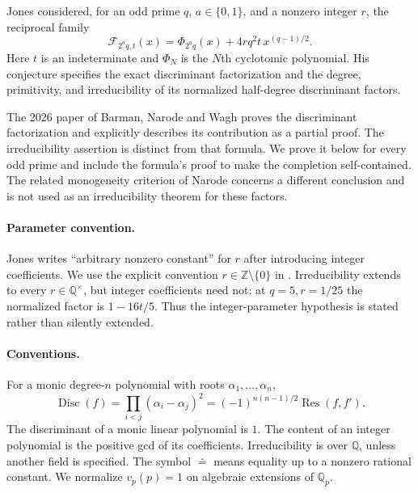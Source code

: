 \documentclass[11pt,a4paper]{article}
\theoremstyle{definition}
\theoremstyle{remark}
\newcommand{\QQ}{\mathbb Q}
\newcommand{\ZZ}{\mathbb Z}
\newcommand{\Disc}{\operatorname{Disc}}
\newcommand{\Res}{\operatorname{Res}}
\begin{document}
Jones \cite[Conjecture~3.3, p.~1476]{Jones} considered, for an odd prime
$q$, $a\in\{0,1\}$, and a nonzero integer $r$, the reciprocal family
\begin{equation}\label{eq:jones-family}
 \mathcal F_{2^a q,t}(x)=\Phi_{2^a q}(x)+4rq^2t\,x^{(q-1)/2}.
\end{equation}
Here $t$ is an indeterminate and $\Phi_N$ is the $N$th cyclotomic
polynomial. His conjecture specifies the exact discriminant
factorization and the degree, primitivity, and irreducibility of its
normalized half-degree discriminant factors.

The 2026 paper of Barman, Narode and Wagh
\cite[Theorem~1.3]{BNW} proves the discriminant factorization and
explicitly describes its contribution as a partial proof. The
irreducibility assertion is distinct from that formula. We prove it
below for every odd prime and include the formula's proof to make the
completion self-contained. The related monogeneity criterion of
Narode \cite{Narode} concerns a different conclusion and is not used
as an irreducibility theorem for these factors.

\paragraph{Parameter convention.}
Jones writes ``arbitrary nonzero constant'' for $r$ after introducing
integer coefficients. We use the explicit convention
$r\in\ZZ\setminus\{0\}$ in \cite[(1.4)--(1.6)]{BNW}.
Irreducibility extends to every $r\in\QQ^\times$, but integer
coefficients need not: at $q=5,r=1/25$ the normalized factor is
$1-16t/5$. Thus the integer-parameter hypothesis is stated rather
than silently extended.

\paragraph{Conventions.}
For a monic degree-$n$ polynomial with roots $\alpha_1,\ldots,\alpha_n$,
\[
 \Disc(f)=\prod_{i<j}(\alpha_i-\alpha_j)^2
 =(-1)^{n(n-1)/2}\Res(f,f').
\]
The discriminant of a monic linear polynomial is $1$.
The content of an integer polynomial is the positive gcd of its
coefficients. Irreducibility is over $\QQ$, unless another field is
specified. The symbol $\doteq$ means equality up to a nonzero rational
constant. We normalize $v_p(p)=1$ on algebraic extensions of $\QQ_p$.
\end{document}
